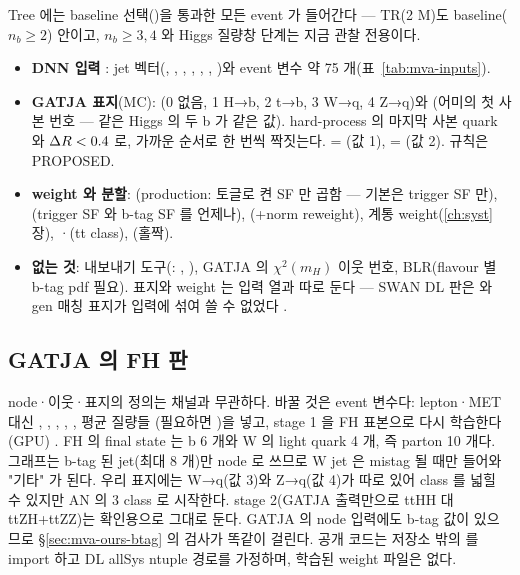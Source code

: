 Tree 에는 baseline 선택()을 통과한 모든 event 가 들어간다 — TR(2 M)도 baseline($n_b\ge2$) 안이고, $n_b\ge3,4$ 와
Higgs 질량창 단계는 지금 관찰 전용이다.
\begin{itemize}
\item \textbf{DNN 입력} \tagimpl\tagtest: jet 벡터(, , , , , , )와
  event 변수 약 75 개(표~\ref{tab:mva-inputs}).
\item \textbf{GATJA 표지}(MC): (0 없음, 1 H→b, 2 t→b, 3 W→q, 4 Z→q)와 (어미의 첫 사본 번호 — 같은 Higgs 의 두 b 가 같은 값).
  hard-process 의 마지막 사본 quark 와 $\Delta R<0.4$ 로, 가까운 순서로 한 번씩 짝짓는다.  = (값 1),
   = (값 2). 규칙은 PROPOSED.
\item \textbf{weight 와 분할}: (production: 토글로 켠 SF 만 곱함 — 기본은 trigger SF 만), (trigger SF 와 b-tag SF 를 언제나),
  (+norm reweight), 계통 weight(\ref{ch:syst}장), ·(tt class),
  (홀짝).
\item \textbf{없는 것}: 내보내기 도구(: , ), GATJA 의 $\chi^2(m_H)$ 이웃 번호, BLR(flavour 별 b-tag pdf
  필요). 표지와 weight 는 입력 열과 따로 둔다 — SWAN DL 판은  와 gen 매칭 표지가 입력에 섞여 쓸 수 없었다
  .
\end{itemize}

\subsection{GATJA 의 FH 판}\label{sec:mva-ours-gatja}

node·이웃·표지의 정의는 채널과 무관하다. 바꿀 것은 event 변수다: lepton·MET 대신 , , , , , 평균 질량들
(필요하면 )을 넣고, stage 1 을 FH 표본으로 다시 학습한다(GPU) \tagplan. FH 의 final state 는 b 6 개와 W 의 light
quark 4 개, 즉 parton 10 개다. 그래프는 b-tag 된 jet(최대 8 개)만 node 로 쓰므로 W jet 은 mistag 될 때만 들어와 "기타" 가 된다. 우리 표지에는
W→q(값 3)와 Z→q(값 4)가 따로 있어 class 를 넓힐 수 있지만 AN 의 3 class 로 시작한다. stage 2(GATJA 출력만으로 ttHH 대
ttZH+ttZZ)는 확인용으로 그대로 둔다. GATJA 의 node 입력에도 b-tag 값이 있으므로 \S\ref{sec:mva-ours-btag} 의 검사가 똑같이 걸린다. 공개 코드는
저장소 밖의  를 import 하고 DL allSys ntuple 경로를 가정하며, 학습된 weight 파일은 없다.

